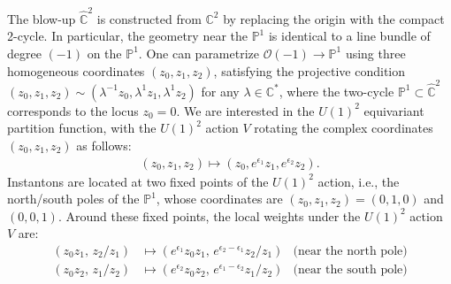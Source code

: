 \documentclass[letterpaper, 11pt]{article}
\def\IC{\mathbb{C}}
\def\IP{\mathbb{P}}
\def\e{\epsilon}
\begin{document}
The blow-up $\hat{\IC}^2$ is constructed from $\IC^2$ by replacing the origin with the compact 2-cycle. In particular, the geometry near the $\IP^1$ is identical to a line bundle of degree $(-1)$ on the $\IP^1$. One can parametrize $\mathcal{O}(-1)\rightarrow \IP^1$ using three homogeneous coordinates $(z_0, z_1, z_2)$, satisfying the projective condition $(z_0, z_1, z_2) \sim (\lambda^{-1}z_0, \lambda^1 z_1, \lambda^1 z_2)$ for any $\lambda \in \IC^*$, where the two-cycle  $\IP^1 \subset \hat{\IC}^2$ corresponds to the locus $z_0 = 0$. 
We are interested in the $U(1)^2$ equivariant partition function, with the $U(1)^2$ action $V$ rotating the complex coordinates $(z_0, z_1, z_2)$ as follows:
\begin{align}
  (z_0, z_1, z_2) \mapsto (z_0, e^{\e_1}z_1, e^{\e_2}z_2).
\end{align}
Instantons are located at two fixed points of the $U(1)^2$ action, i.e., the north/south poles of the $\mathbb{P}^1$, whose coordinates are 
$(z_0, z_1, z_2)  = (0,1,0)$ and $(0,0,1)$. Around these fixed points, the local weights under the $U(1)^2$ action $V$ are:
\begin{align}
  (z_0 z_1,\,z_2/z_1) &\mapsto  (e^{\e_1}z_0 z_1, \,e^{\e_2 - \e_1}z_2/z_1) &  \text{(near the north pole)}\\
  (z_0 z_2,\,z_1/z_2) &\mapsto (e^{\e_2}z_0 z_2, \,e^{\e_1 - \e_2}z_1/z_2) &  \text{(near the south pole)}
\end{align}
\end{document}
